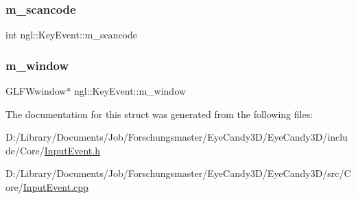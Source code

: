 \subsubsection{\texorpdfstring{m\+\_\+scancode}{m\_scancode}}
{\footnotesize\ttfamily int ngl\+::\+Key\+Event\+::m\+\_\+scancode}

\mbox{\label{structngl_1_1_key_event_a9d9dce7f11631abfb6bb111147c341e5}} 
\subsubsection{\texorpdfstring{m\+\_\+window}{m\_window}}
{\footnotesize\ttfamily G\+L\+F\+Wwindow$\ast$ ngl\+::\+Key\+Event\+::m\+\_\+window}



The documentation for this struct was generated from the following files\+:\begin{DoxyCompactItemize}
\item 
D\+:/\+Library/\+Documents/\+Job/\+Forschungsmaster/\+Eye\+Candy3\+D/\+Eye\+Candy3\+D/include/\+Core/\mbox{\hyperlink{_input_event_8h}{Input\+Event.\+h}}\item 
D\+:/\+Library/\+Documents/\+Job/\+Forschungsmaster/\+Eye\+Candy3\+D/\+Eye\+Candy3\+D/src/\+Core/\mbox{\hyperlink{_input_event_8cpp}{Input\+Event.\+cpp}}\end{DoxyCompactItemize}
